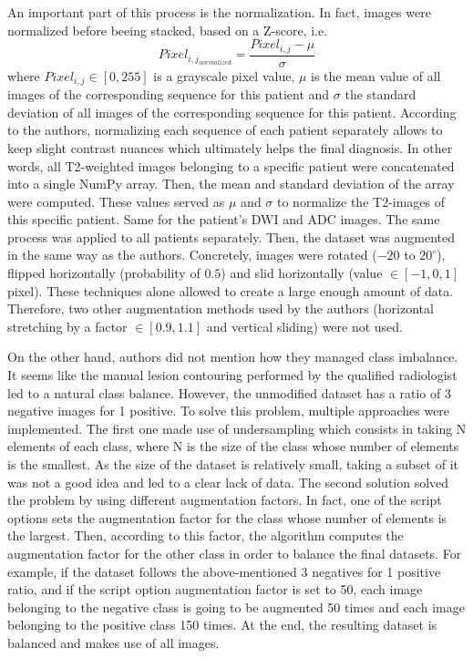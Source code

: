 An important part of this process is the normalization. In fact, images were normalized before beeing stacked, based on a Z-score, i.e. 
\begin{equation}
\label{eq:normalization}
	Pixel_{{i,j}_{normalized}} = \frac{Pixel_{i,j} - \mu}{\sigma}
\end{equation}
\noindent where $Pixel_{i,j} \in [0,255]$ is a grayscale pixel value, $\mu$ is the mean value of all images of the corresponding sequence for this patient and $\sigma$ the standard deviation of all images of the corresponding sequence for this patient. According to the authors, normalizing each sequence of each patient separately allows to keep slight contrast nuances which ultimately helps the final diagnosis. In other words, all T2-weighted images belonging to a specific patient were concatenated into a single NumPy array. Then, the mean and standard deviation of the array were computed. These values served as $\mu$ and $\sigma$ to normalize the T2-images of this specific patient. Same for the patient's DWI and ADC images. The same process was applied to all patients separately.
Then, the dataset was augmented in the same way as the authors. Concretely, images were rotated ($-20$ to $20^\circ$), flipped horizontally (probability of $0.5$) and slid horizontally (value $\in [-1, 0, 1]$ pixel). These techniques alone allowed to create a large enough amount of data. Therefore, two other augmentation methods used by the authors (horizontal stretching by a factor $\in [0.9,1.1]$ and vertical sliding) were not used.

On the other hand, authors did not mention how they managed class imbalance. It seems like the manual lesion contouring performed by the qualified radiologist led to a natural class balance. However, the unmodified dataset has a ratio of 3 negative images for 1 positive. To solve this problem, multiple approaches were implemented. The first one made use of undersampling which consists in taking N elements of each class, where N is the size of the class whose number of elements is the smallest. As the size of the dataset is relatively small, taking a subset of it was not a good idea and led to a clear lack of data. The second solution solved the problem by using different augmentation factors. In fact, one of the script options sets the augmentation factor for the class whose number of elements is the largest. Then, according to this factor, the algorithm computes the augmentation factor for the other class in order to balance the final datasets. For example, if the dataset follows the above-mentioned 3 negatives for 1 positive ratio, and if the script option augmentation factor is set to 50, each image belonging to the negative class is going to be augmented 50 times and each image belonging to the positive class 150 times. At the end, the resulting dataset is balanced and makes use of all images.

